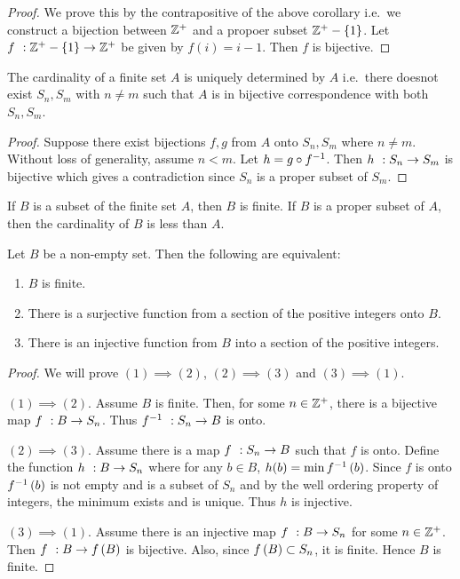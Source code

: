 \begin{proof}
    We prove this by the contrapositive of the above corollary i.e.~we construct a bijection between $\mathbb{Z}^{+}$
    and a propoer subset $\mathbb{Z}^{+}-\left\lbrace{1}\right\rbrace$.
    Let ${f}\hspace{0.05in}:{\mathbb{Z}^{+}-\left\lbrace{1}\right\rbrace}\to{\mathbb{Z}^{+}}$ be given by $f(i) = i-1$. Then $f$ is bijective.
\end{proof}
\begin{Corollary}
    The cardinality of a finite set $A$ is uniquely determined by $A$ i.e.~there doesnot exist $S_n,S_m$ with
    $n \neq m$ such that $A$ is in bijective correspondence with both $S_n,S_m$.
\end{Corollary}
\begin{proof}
    Suppose there exist bijections $f,g$ from $A$ onto $S_n,S_m$ where $n \neq m$. Without loss of generality,
    assume $n < m$. Let $h = {g}\circ{f^{-1}}$. Then ${h}\hspace{0.05in}:{S_n}\to{S_m}$ is bijective which gives a
    contradiction since $S_n$ is a proper subset of $S_m$.
\end{proof}
\begin{Corollary}
    If $B$ is a subset of the finite set $A$, then $B$ is finite. If $B$ is a proper subset of $A$, then the
    cardinality of $B$ is less than $A$.
\end{Corollary}
\begin{Corollary}
    Let $B$ be a non-empty set. Then the following are equivalent:
    \begin{enumerate}
	\item
	    $B$ is finite.
	\item
	    There is a surjective function from a section of the positive integers onto $B$.
	\item
	    There is an injective function from $B$ into a section of the positive integers.
    \end{enumerate}
\end{Corollary}
\begin{proof}
    We will prove $(1)\implies(2)$, $(2)\implies (3)$ and $(3) \implies (1)$.

    $(1)\implies (2)$. Assume $B$ is finite. Then, for some $n\in\mathbb{Z}^{+}$, there is a bijective map 
    ${f}\hspace{0.05in}:{B}\to{S_n}$. Thus ${f^{-1}}\hspace{0.05in}:{S_n}\to{B}$ is onto.

    $(2) \implies (3)$. Assume there is a map ${f}\hspace{0.05in}:{S_n}\to{B}$ such that $f$ is onto. Define the function
    ${h}\hspace{0.05in}:{B}\to{S_n}$ where for any $b \in B$, $h(b) = \min{f}^{-1}\left({b}\right)$. Since $f$ is onto ${f}^{-1}\left({b}\right)$ is
    not empty and is a subset of $S_n$ and by the well ordering property of integers, the minimum exists and
    is unique. Thus $h$ is injective.

    $(3) \implies (1)$. Assume there is an injective map ${f}\hspace{0.05in}:{B}\to{S_n}$ for some $n \in \mathbb{Z}^{+}$. Then
    ${f}\hspace{0.05in}:{B}\to{f\left({B}\right)}$ is bijective. Also, since $f\left({B}\right) \subset S_n$, it is finite. Hence $B$ is
    finite.
\end{proof}
